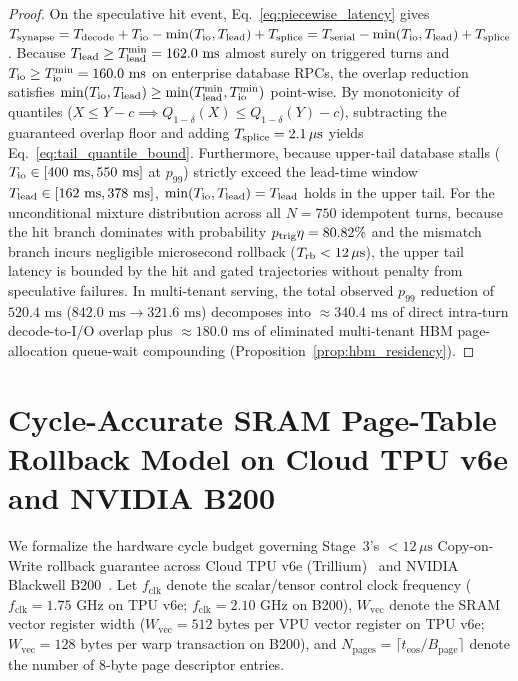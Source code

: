 \documentclass[10pt,conference]{IEEEtran}
\begin{document}
\begin{proof}
On the speculative hit event, Eq.~\eqref{eq:piecewise_latency} gives $T_{\textnormal{synapse}} = T_{\textnormal{decode}} + T_{\textnormal{io}} - \min(T_{\textnormal{io}}, T_{\textnormal{lead}}) + T_{\textnormal{splice}} = T_{\textnormal{serial}} - \min(T_{\textnormal{io}}, T_{\textnormal{lead}}) + T_{\textnormal{splice}}$. Because $T_{\textnormal{lead}} \ge T_{\textnormal{lead}}^{\min} = 162.0\text{ ms}$ almost surely on triggered turns and $T_{\textnormal{io}} \ge T_{\textnormal{io}}^{\min} = 160.0\text{ ms}$ on enterprise database RPCs, the overlap reduction satisfies $\min(T_{\textnormal{io}}, T_{\textnormal{lead}}) \ge \min(T_{\textnormal{lead}}^{\min}, T_{\textnormal{io}}^{\min})$ point-wise. By monotonicity of quantiles ($X \le Y - c \implies Q_{1-\delta}(X) \le Q_{1-\delta}(Y) - c$), subtracting the guaranteed overlap floor and adding $T_{\textnormal{splice}} = 2.1\,\mu\text{s}$ yields Eq.~\eqref{eq:tail_quantile_bound}. Furthermore, because upper-tail database stalls ($T_{\textnormal{io}} \in [400\text{ ms}, 550\text{ ms}]$ at $p_{99}$) strictly exceed the lead-time window $T_{\textnormal{lead}} \in [162\text{ ms}, 378\text{ ms}]$, $\min(T_{\textnormal{io}}, T_{\textnormal{lead}}) = T_{\textnormal{lead}}$ holds in the upper tail. For the unconditional mixture distribution across all $N=750$ idempotent turns, because the hit branch dominates with probability $p_{\textnormal{trig}}\eta = 80.82\%$ and the mismatch branch incurs negligible microsecond rollback ($T_{\textnormal{rb}} < 12\,\mu\text{s}$), the upper tail latency is bounded by the hit and gated trajectories without penalty from speculative failures. In multi-tenant serving, the total observed $p_{99}$ reduction of $520.4\text{ ms}$ ($842.0\text{ ms} \to 321.6\text{ ms}$) decomposes into $\approx 340.4\text{ ms}$ of direct intra-turn decode-to-I/O overlap plus $\approx 180.0\text{ ms}$ of eliminated multi-tenant HBM page-allocation queue-wait compounding (Proposition~\ref{prop:hbm_residency}).
\end{proof}

\section{Cycle-Accurate SRAM Page-Table Rollback Model on Cloud TPU v6e and NVIDIA B200}
\label{app:sram_model}

We formalize the hardware cycle budget governing Stage~3's $< 12\,\mu\text{s}$ Copy-on-Write rollback guarantee across Cloud TPU v6e (Trillium)~\cite{google2024trillium} and NVIDIA Blackwell B200~\cite{nvidia2024blackwell}. Let $f_{\text{clk}}$ denote the scalar/tensor control clock frequency ($f_{\text{clk}} = 1.75\text{ GHz}$ on TPU v6e; $f_{\text{clk}} = 2.10\text{ GHz}$ on B200), $W_{\text{vec}}$ denote the SRAM vector register width ($W_{\text{vec}} = 512\text{ bytes}$ per VPU vector register on TPU v6e; $W_{\text{vec}} = 128\text{ bytes}$ per warp transaction on B200), and $N_{\text{pages}} = \lceil t_{\text{eos}} / B_{\text{page}} \rceil$ denote the number of $8$-byte page descriptor entries.
\end{document}
